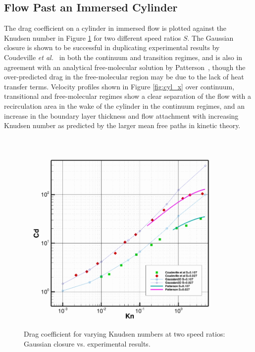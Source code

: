 \documentclass[titlepage,11pt,letterpaper]{article}
\begin{document}
\subsection{Flow Past an Immersed Cylinder}
The drag coefficient on a cylinder in immersed flow is plotted against the Knudsen number in 
Figure \ref{fig:cyl_d} for two different speed ratios $S$. %
The Gaussian closure is shown to be successful in duplicating experimental results by 
Coudeville \textit{et al.}~\cite{coudeville:1965} in both the continuum and transition 
regimes, and is also in agreement with an analytical free-molecular solution by 
Patterson~\cite{patterson:1961}, though the over-predicted drag in the free-molecular region 
may be due to the lack of heat transfer terms. Velocity profiles shown in Figure 
\ref{fig:cyl_x} over continuum, transitional and free-molecular regimes show a clear 
separation of the flow with a recirculation area in the wake of the cylinder in the 
continuum regimes, and an increase in the boundary layer thickness and flow attachment with 
increasing Knudsen number as predicted by the larger mean free paths in kinetic theory.
%
\begin{figure}[t]
  \begin{center}
    \includegraphics[width=0.45\textheight]{./figs/cylinder1.jpg}
    \caption{Drag coefficient for varying Knudsen numbers at two speed ratios: 
      Gaussian closure vs. experimental results.}
    \label{fig:cyl_d}
  \end{center}    
\end{figure}
\end{document}

